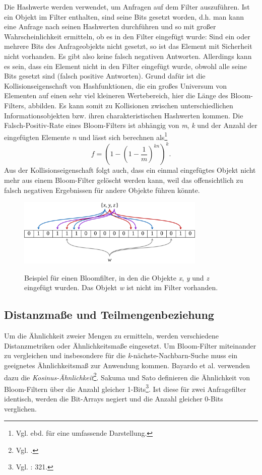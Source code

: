 Die Hashwerte werden verwendet, um Anfragen auf dem Filter auszuführen. Ist ein Objekt im Filter enthalten, sind seine Bits gesetzt worden, d.h. man kann eine Anfrage nach seinen Hashwerten durchführen und so mit großer Wahrscheinlichkeit ermitteln, ob es in den Filter eingefügt wurde: Sind ein oder mehrere Bits des Anfrageobjekts nicht gesetzt, so ist das Element mit Sicherheit nicht vorhanden. Es gibt also keine falsch negativen Antworten. Allerdings kann es sein, dass ein Element nicht in den Filter eingefügt wurde, obwohl alle seine Bits gesetzt sind (falsch positive Antworten). Grund dafür ist die Kollisionseigenschaft von Hashfunktionen, die ein großes Universum von Elementen auf einen sehr viel kleineren Wertebereich, hier die Länge des Bloom-Filters, abbilden. Es kann somit zu Kollisionen zwischen unterschiedlichen Informationsobjekten bzw. ihren charakteristischen Hashwerten kommen. Die Falsch-Positiv-Rate eines Bloom-Filters ist abhängig von \textit{m}, \textit{k} und der Anzahl der eingefügten Elemente \textit{n} und lässt sich berechnen als\footnote{Vgl. ebd. für eine umfassende Darstellung.}
\[f = \left(1 - \left(1-\frac{1}{m}\right)^{kn}\right)^k.\]
Aus der Kollisionseigenschaft folgt auch, dass ein einmal eingefügtes Objekt nicht mehr aus einem Bloom-Filter gelöscht werden kann, weil das offensichtlich zu falsch negativen Ergebnissen für andere Objekte führen könnte. 
\begin{figure}[hpbt]
  \centering
  \includegraphics[width=0.8\textwidth]{pictures/1280px-Bloom_filter.png}\\
  \caption[Bloomfilter-Beispiel, Bildnachweis: \url{https://commons.wikimedia.org/wiki/File:Bloom_filter.svg}.]{Beispiel für einen Bloomfilter, in den die Objekte \textit{x}, \textit{y} und \textit{z} eingefügt wurden. Das Objekt \textit{w} ist nicht im Filter vorhanden.}\label{fig:pic0}
\end{figure}
\subsection{Distanzmaße und Teilmengenbeziehung}\label{sec:bloom-operationen}
Um die Ähnlichkeit zweier Mengen zu ermitteln, werden verschiedene Distanzmetriken oder Ähnlichkeitsmaße eingesetzt. Um Bloom-Filter miteinander zu vergleichen und insbesondere für die \textit{k}-nächste-Nachbarn-Suche muss ein geeignetes Ähnlichkeitsmaß zur Anwendung kommen. Bayardo et al. verwenden dazu die \textit{Kosinus-Ähnlichkeit}\footnote{Vgl. \cite{Bayardo2007}.}. Sakuma und Sato definieren die Ähnlichkeit von Bloom-Filtern über die Anzahl gleicher 1-Bits\footnote{Vgl. \cite{Sakuma2011}: 321.}. Ist diese für zwei Anfragefilter identisch, werden die Bit-Arrays negiert und die Anzahl gleicher 0-Bits verglichen. 

